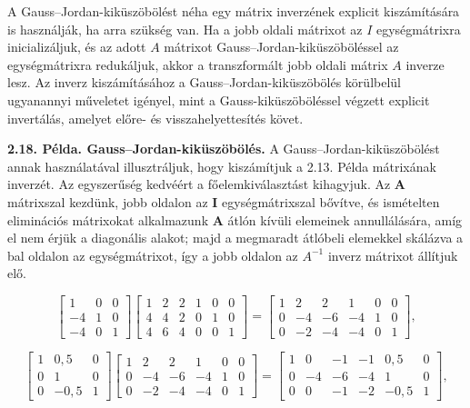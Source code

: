 \documentclass[
  magyar,
  11pt]{article}
\providecommand{\boldsymbol}[1]{\mathbf{#1}}
\begin{document}
A Gauss--Jordan-kiküszöbölést néha egy mátrix inverzének explicit
kiszámítására is használják, ha arra szükség van. Ha a jobb oldali
mátrixot az \(I\) egységmátrixra inicializáljuk, és az adott \(A\)
mátrixot Gauss--Jordan-kiküszöböléssel az egységmátrixra redukáljuk,
akkor a transzformált jobb oldali mátrix \(A\) inverze lesz. Az inverz
kiszámításához a Gauss--Jordan-kiküszöbölés körülbelül ugyanannyi
műveletet igényel, mint a Gauss-kiküszöböléssel végzett explicit
invertálás, amelyet előre- és visszahelyettesítés követ.

\textbf{2.18. Példa. Gauss--Jordan-kiküszöbölés.} A
Gauss--Jordan-kiküszöbölést annak használatával illusztráljuk, hogy
kiszámítjuk a 2.13. Példa mátrixának inverzét. Az egyszerűség kedvéért a
főelemkiválasztást kihagyjuk. Az \(\boldsymbol{A}\) mátrixszal kezdünk,
jobb oldalon az \(\boldsymbol{I}\) egységmátrixszal bővítve, és
ismételten eliminációs mátrixokat alkalmazunk \(\boldsymbol{A}\) átlón
kívüli elemeinek annullálására, amíg el nem érjük a diagonális alakot;
majd a megmaradt átlóbeli elemekkel skálázva a bal oldalon az
egységmátrixot, így a jobb oldalon az \(A^{-1}\) inverz mátrixot
állítjuk elő.

\[\begin{bmatrix} 1 & 0 & 0 \\ -4 & 1 & 0 \\ -4 & 0 & 1 \end{bmatrix} \begin{bmatrix} 1 & 2 & 2 & 1 & 0 & 0 \\ 4 & 4 & 2 & 0 & 1 & 0 \\ 4 & 6 & 4 & 0 & 0 & 1 \end{bmatrix} = \begin{bmatrix} 1 & 2 & 2 & 1 & 0 & 0 \\ 0 & -4 & -6 & -4 & 1 & 0 \\ 0 & -2 & -4 & -4 & 0 & 1 \end{bmatrix},\]

\[\begin{bmatrix} 1 & 0{,}5 & 0 \\ 0 & 1 & 0 \\ 0 & -0{,}5 & 1 \end{bmatrix} \begin{bmatrix} 1 & 2 & 2 & 1 & 0 & 0 \\ 0 & -4 & -6 & -4 & 1 & 0 \\ 0 & -2 & -4 & -4 & 0 & 1 \end{bmatrix} = \begin{bmatrix} 1 & 0 & -1 & -1 & 0{,}5 & 0 \\ 0 & -4 & -6 & -4 & 1 & 0 \\ 0 & 0 & -1 & -2 & -0{,}5 & 1 \end{bmatrix},\]
\end{document}
